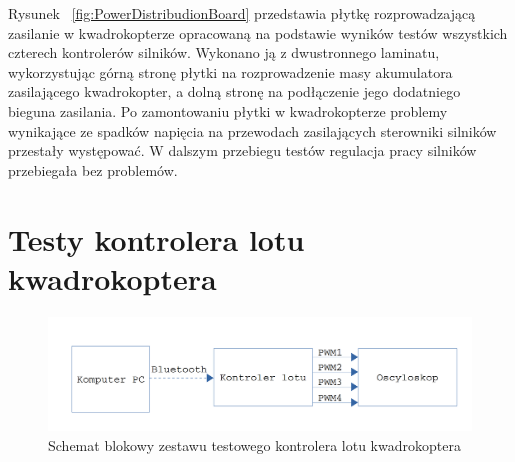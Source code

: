 Rysunek ~\ref{fig:PowerDistribudionBoard} przedstawia płytkę rozprowadzającą zasilanie w kwadrokopterze opracowaną na podstawie wyników testów wszystkich czterech kontrolerów silników. Wykonano ją z dwustronnego laminatu, wykorzystując górną stronę płytki na rozprowadzenie masy akumulatora zasilającego kwadrokopter, a dolną stronę na podłączenie jego dodatniego bieguna zasilania. Po zamontowaniu płytki w kwadrokopterze problemy wynikające ze spadków napięcia na przewodach zasilających sterowniki silników przestały występować. W dalszym przebiegu testów regulacja pracy silników przebiegała bez problemów.

\section{Testy kontrolera lotu kwadrokoptera}

\begin{figure}[H]
	\centering
	\includegraphics[scale=0.2]{Pictures/QuadrotorController_test.png}
	\caption[Schemat blokowy zestawu testowego kontrolera lotu kwadrokoptera]{Schemat blokowy zestawu testowego kontrolera lotu kwadrokoptera}
	\label{fig:QuadrotorController_test}
\end{figure}


